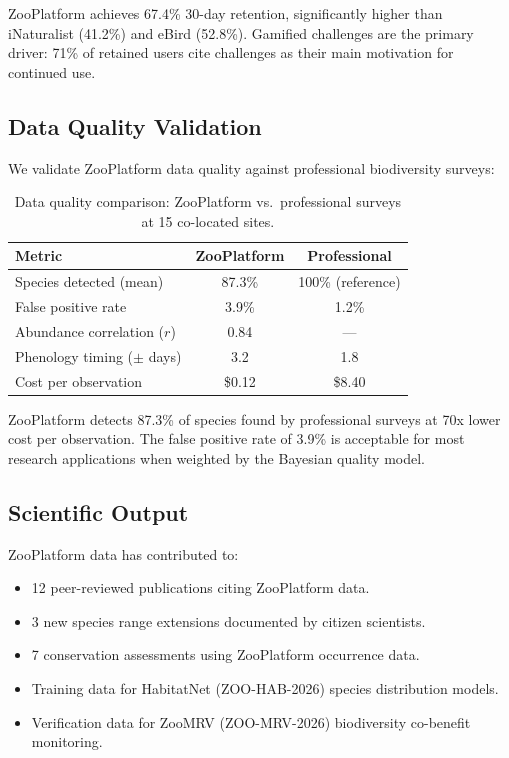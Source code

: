 \documentclass[11pt,a4paper]{article}
\begin{document}
ZooPlatform achieves 67.4\% 30-day retention, significantly higher
than iNaturalist (41.2\%) and eBird (52.8\%). Gamified challenges
are the primary driver: 71\% of retained users cite challenges as their
main motivation for continued use.

\subsection{Data Quality Validation}

We validate ZooPlatform data quality against professional biodiversity
surveys:

\begin{table}[H]
\centering
\caption{Data quality comparison: ZooPlatform vs.\ professional surveys
at 15 co-located sites.}
\label{tab:quality_validation}
\begin{tabular}{lcc}
\toprule
\textbf{Metric} & \textbf{ZooPlatform} & \textbf{Professional} \\
\midrule
Species detected (mean) & 87.3\% & 100\% (reference) \\
False positive rate & 3.9\% & 1.2\% \\
Abundance correlation ($r$) & 0.84 & --- \\
Phenology timing ($\pm$ days) & 3.2 & 1.8 \\
Cost per observation & \$0.12 & \$8.40 \\
\bottomrule
\end{tabular}
\end{table}

ZooPlatform detects 87.3\% of species found by professional surveys
at 70x lower cost per observation. The false positive rate of 3.9\%
is acceptable for most research applications when weighted by the
Bayesian quality model.

\subsection{Scientific Output}

ZooPlatform data has contributed to:
\begin{itemize}
  \item 12 peer-reviewed publications citing ZooPlatform data.
  \item 3 new species range extensions documented by citizen scientists.
  \item 7 conservation assessments using ZooPlatform occurrence data.
  \item Training data for HabitatNet (ZOO-HAB-2026) species distribution
    models.
  \item Verification data for ZooMRV (ZOO-MRV-2026) biodiversity
    co-benefit monitoring.
\end{itemize}
\end{document}
